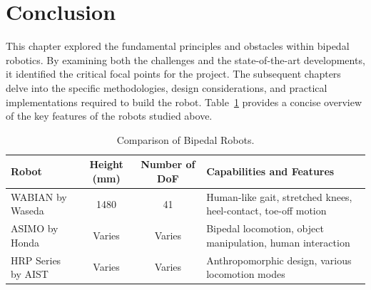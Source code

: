 \section{Conclusion}
This chapter explored the fundamental principles and obstacles within
bipedal robotics. By examining both the challenges and the
state-of-the-art developments, it identified the critical focal points
for the project. The subsequent chapters delve into the specific
methodologies, design considerations, and practical implementations
required to build the robot. Table~\ref{tab:bipedal} provides a concise
overview of the key features of the robots studied above.

\begin{table}[ht]
  \centering
  \caption{Comparison of Bipedal Robots.}
  \label{tab:bipedal}
  \small
  \renewcommand{\arraystretch}{1.3}
  \begin{tabularx}{\textwidth}{@{}lccX@{}}
    \toprule
    \textbf{Robot} & \textbf{Height (mm)} & \textbf{Number of DoF} &
    \textbf{Capabilities and Features} \\
    \midrule
    WABIAN by Waseda & 1480 & 41 & Human-like gait, stretched knees, heel-contact, toe-off motion \\
    ASIMO by Honda   & Varies & Varies & Bipedal locomotion, object manipulation, human interaction \\
    HRP Series by AIST & Varies & Varies & Anthropomorphic design, various locomotion modes \\
    \bottomrule
  \end{tabularx}
\end{table}
